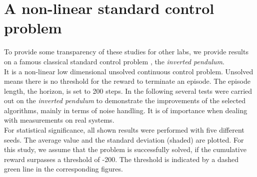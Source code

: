 \documentclass[
reprint,
amsmath,amssymb,amsfonts,clevref,
aps,
prstab,
]{revtex4-2}
\begin{document}
 
 
 
 
  \newpage
	\appendix
	\section{A non-linear standard control problem}
	To provide some transparency of these studies for other labs, we provide results on a famous classical standard control problem \cite{Furutaa}, the \emph{inverted pendulum}.\\
	 It is a non-linear low dimensional unsolved continuous control problem. Unsolved means there is no threshold for the reward to terminate an episode. The episode length, the horizon, is set to 200 steps. In the following several tests were carried out on the \emph{inverted pendulum} to demonstrate the improvements of the selected algorithms, mainly in terms of noise handling. It is of importance when dealing with measurements on real systems.\\
	 For statistical significance, all shown results were performed with five different seeds. The average value and the standard deviation (shaded) are plotted. For this study, we assume that the problem is successfully solved, if the cumulative reward surpasses a threshold of -200. The threshold is indicated by a dashed green line in the corresponding figures.
	
\end{document}
